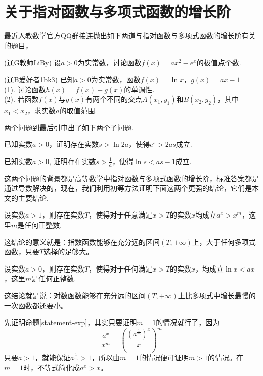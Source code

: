 
\section{关于指对函数与多项式函数的增长阶}
\label{sec:exp-log-level}

最近人教数学官方QQ群接连抛出如下两道与指对函数与多项式函数的增长阶有关的题目，
\begin{exercise}
  (辽G教师LiBy) 设$a>0$为实常数，讨论函数$f(x)=ax^2-e^x$的极值点个数.
\end{exercise}

\begin{exercise}
  (辽B爱好者1bk3) 已知$a>0$为实常数，函数$f(x)=\ln{x}$，$g(x)=ax-1$ \\
  (1). 讨论函数$h(x)=f(x)-g(x)$的单调性. \\
  (2). 若函数$f(x)$与$g(x)$有两个不同的交点$A(x_1,y_1)$和$B(x_2,y_2)$，其中$x_1<x_2$，求实数$a$的取值范围.
\end{exercise}
两个问题到最后引申出了如下两个子问题.
\begin{topic}
  \label{topic-exp}
  已知实数$a>0$，证明存在实数$s>\ln{2a}$，使得$e^s>2as$成立.
\end{topic}

\begin{topic}
  \label{topic-log}
  已知实数$a>0$, 证明存在实数$s>\frac{1}{a}$，使得$\ln{s}<as-1$成立.
\end{topic}

这两个问题的背景都是高等数学中指对函数与多项式函数的增长阶，标准答案都是通过导数解决的，现在，我们利用初等方法证明下面这两个更强的结论，它们是本文的主要结论.
\begin{statement}
  \label{statement-exp}
  设实数$a>1$，则存在实数$T$，使得对于任意满足$x>T$的实数$x$均成立$a^x>x^m$，这里$m$是任何正整数.
\end{statement}
这结论的意义就是：指数函数能够在充分远的区间$(T,+\infty)$上，大于任何多项式函数，只要$T$选择的足够大。

\begin{statement}
  \label{statement-log}
  设实数$a>0$，则存在实数$T$，使得对于任何满足$x>T$的实数$x$，均成立$\ln{x}<ax$，这里$m$是任何正整数.
\end{statement}
这结论就是说：对数函数能够在充分远的区间$(T,+\infty)$上比多项式中增长最慢的一次函数都还要小。

先证明命题\ref{statement-exp}，其实只要证明$m=1$的情况就行了，因为
\[ \frac{a^x}{x^m} = \left( \frac{(a^{\frac{1}{m}})^x}{x} \right)^m \]
只要$a>1$，就能保证$a^{\frac{1}{m}}>1$，所以由$m=1$的情况便可证明$m>1$的情况。在$m=1$时，不等式简化成$a^x>x$。

